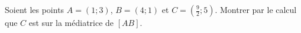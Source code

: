 
\begin{exercice}\label{exoSeconde-0010}

    Soient les points \( A=(1;3)\), \( B=(4;1)\) et \( C=(\frac{ 9 }{ 2 };5)\). Montrer par le calcul que \( C\) est sur la médiatrice de \( [AB]\).

\end{exercice}
